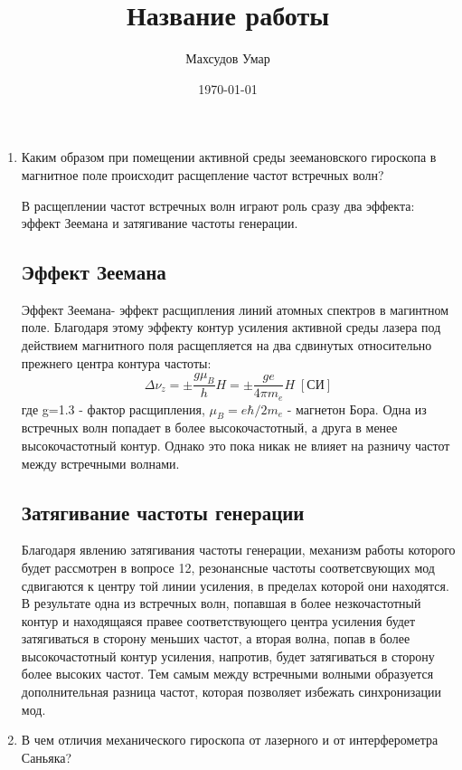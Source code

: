 \documentclass[a4paper,12pt]{article}
\author{Махсудов Умар}
\title{Название работы}
\date{\today}
\theoremstyle{plain} %
\theoremstyle{definition} %
\theoremstyle{remark} %
\newcommand{\s}[0]{
	\;	
}
\begin{document}
	\maketitle
	\begin{abstract}
		
	\end{abstract}
	\begin{enumerate}
		\item
		Каким образом при помещении активной среды зеемановского гироскопа в магнитное поле происходит расщепление частот встречных волн?
		
		
		В расщеплении частот встречных волн играют роль сразу два эффекта: эффект Зеемана и затягивание частоты генерации. 
		\subsection{Эффект Зеемана}
		
		
		Эффект Зеемана- эффект расщипления линий атомных спектров в магинтном поле. Благодаря этому эффекту контур усиления активной среды лазера под действием магнитного поля расщепляется на два сдвинутых относительно прежнего центра контура частоты: 
		\begin{equation}\label{key}
			\Delta\nu_z=\pm\frac{g\mu_B}{h}H=\pm\frac{ge}{4\pi m_e}H\s [СИ]
		\end{equation} 
	где g=1.3 - фактор расщипления, $ \mu_B=e\hbar/2m_e $ - магнетон Бора. Одна из встречных волн попадает в более высокочастотный, а друга в менее высокочастотный контур. Однако это пока никак не влияет на разничу частот между встречными волнами. 
	\subsection{Затягивание частоты генерации}
	
	
	Благодаря явлению затягивания частоты генерации, механизм работы которого будет рассмотрен в вопросе 12, резонансные частоты соответсвующих мод сдвигаются к центру той линии усиления, в пределах которой они находятся. В результате одна из встречных волн, попавшая в более незкочастотный контур и находящаяся правее соответствующего центра усиления будет затягиваться в сторону меньших частот, а вторая волна, попав в более высокочастотный контур усиления, напротив, будет затягиваться в сторону более высоких частот. Тем самым между встречными волными образуется дополнительная разница частот, которая позволяет избежать синхронизации мод.
	\item
	В чем отличия механического гироскопа от лазерного и от интерферометра Саньяка?



\end{enumerate}
\end{document}
